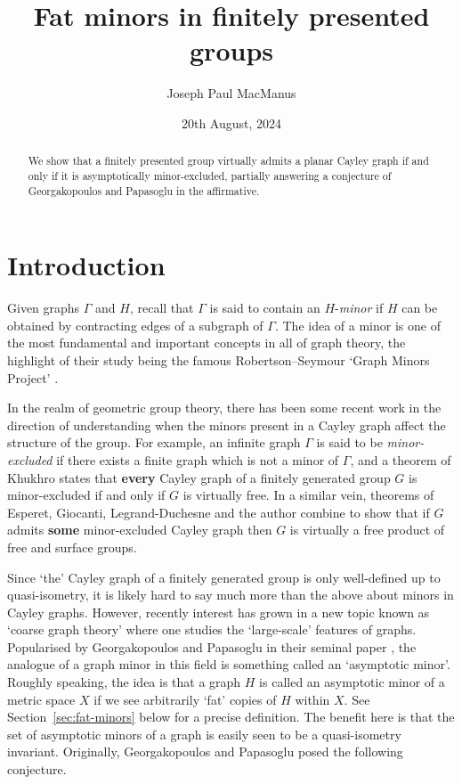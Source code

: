 \documentclass[10pt,a4paper]{amsart}
\title[Fat minors in finitely presented groups]{Fat minors in finitely presented groups}
\author{Joseph Paul MacManus}
\date{20th August, 2024}
\theoremstyle{definition}
\begin{document}
\begin{abstract}
    We show that a finitely presented group virtually admits a planar Cayley graph if and only if it is asymptotically minor-excluded, partially answering a conjecture of Georgakopoulos and Papasoglu in the affirmative.     
\end{abstract}


\maketitle






\section{Introduction}


Given graphs $\Gamma$ and $H$, recall that $\Gamma$ is said to contain an $H$-\textit{minor} if $H$ can be obtained by contracting edges of a subgraph of $\Gamma$. The idea of a minor is one of the most fundamental and important concepts in all of graph theory, the highlight of their study being the famous Robertson--Seymour `Graph Minors Project' \cite{robertson1983graph}. 

In the realm of geometric group theory, there has been some recent work in the direction of understanding when the minors present in a Cayley graph affect the structure of the group. For example, an infinite graph $\Gamma$ is said to be \textit{minor-excluded} if there exists a finite graph which is not a minor of $\Gamma$, and a theorem of Khukhro \cite{khukhro2023characterisation} states that \textbf{every} Cayley graph of a finitely generated group $G$ is minor-excluded if and only if $G$ is virtually free.
In a similar vein, theorems of Esperet, Giocanti, Legrand-Duchesne and the author \cite{esperet2023structure, esperet2024coarse, macmanus2023accessibility} combine to show that if $G$ admits \textbf{some} minor-excluded Cayley graph then $G$ is virtually a free product of free and surface groups.

Since `the' Cayley graph of a finitely generated group is only well-defined up to quasi-isometry, it is likely hard to say much more than the above about minors in Cayley graphs. 
However, recently interest has grown in a new topic known as `coarse graph theory' where one studies the `large-scale' features of graphs. Popularised by Georgakopoulos and Papasoglu in their seminal paper \cite{georgakopoulos2023graph}, the analogue of a graph minor in this field is something called an `asymptotic minor'. Roughly speaking, the idea is that a graph $H$ is called an asymptotic minor of a metric space $X$ if we see arbitrarily `fat' copies of $H$ within $X$. See Section~\ref{sec:fat-minors} below for a precise definition. The benefit here is that the set of asymptotic minors of a graph is easily seen to be a quasi-isometry invariant. 
Originally, Georgakopoulos and Papasoglu posed the following conjecture.
\end{document}

